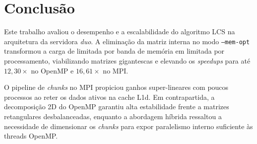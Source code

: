 \section{Conclusão}
\label{sec:conclusao}

Este trabalho avaliou o desempenho e a escalabilidade do algoritmo LCS na arquitetura da servidora \textit{duo}. A eliminação da matriz interna no modo \texttt{--mem-opt} transformou a carga de limitada por banda de memória em limitada por processamento, viabilizando matrizes gigantescas e elevando os \textit{speedups} para até $12{,}30\times$ no OpenMP e $16{,}61\times$ no MPI.

O pipeline de \textit{chunks} no MPI propiciou ganhos super-lineares com poucos processos ao reter os dados ativos na cache L1d. Em contrapartida, a decomposição 2D do OpenMP garantiu alta estabilidade frente a matrizes retangulares desbalanceadas, enquanto a abordagem híbrida ressaltou a necessidade de dimensionar os \textit{chunks} para expor paralelismo interno suficiente às threads OpenMP.
